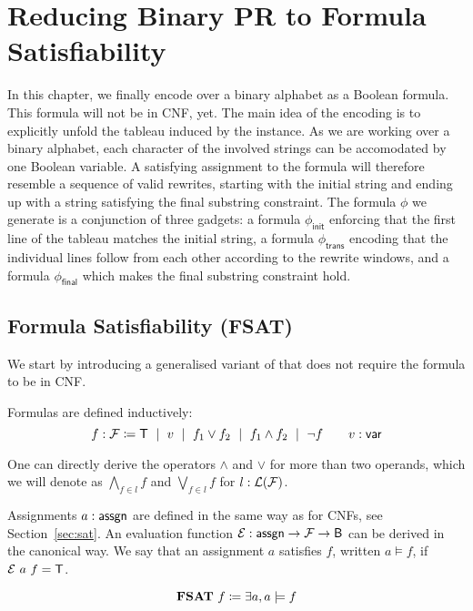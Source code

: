 
\chapter{Reducing Binary PR to Formula Satisfiability}\label{chap:bpr_fsat}
In this chapter, we finally encode \PR{} over a binary alphabet as a Boolean formula. This formula will not be in CNF, yet.
The main idea of the encoding is to explicitly unfold the tableau induced by the \BPR{} instance.
As we are working over a binary alphabet, each character of the involved strings can be accomodated by one Boolean variable. A satisfying assignment to the formula will therefore resemble a sequence of valid rewrites, starting with the initial string and ending up with a string satisfying the final substring constraint.
The formula $\phi$ we generate is a conjunction of three gadgets: a formula $\phi_{\textsf{init}}$ enforcing that the first line of the tableau matches the initial string, a formula $\phi_{\textsf{trans}}$ encoding that the individual lines follow from each other according to the rewrite windows, and a formula $\phi_{\textsf{final}}$ which makes the final substring constraint hold. 

\newcommand{\formula}{\mathcal{F}}
\section{Formula Satisfiability (FSAT)}
We start by introducing a generalised variant of \SAT{} that does not require the formula to be in CNF.

Formulas are defined inductively: 
\mnote{$\formula$}
\[f : \formula \defeq \btrue \bnfmid v \bnfmid f_1 \lor f_2 \bnfmid f_1 \land f_2 \bnfmid \lnot f \qquad v : \bvar \]

One can directly derive the operators $\land$ and $\lor$ for more than two operands, which we will denote as $\bigwedge_{f \in l} f$ and $\bigvee_{f \in l} f$ for $ l : \listsof{\formula}$. 

Assignments $a : \textsf{assgn}$ are defined in the same way as for CNFs, see Section~\ref{sec:sat}.
An evaluation function $\eval : \assgn \rightarrow \formula \rightarrow \bool$ can be derived in the canonical way. We say that an assignment $a$ satisfies $f$, written $a \models f$, if $\mathcal{E}~a~f = \mathsf{T}$.

\begin{definition}
  \mnote{\fsat{}}
  \[\textbf{FSAT}{}~f \coloneqq \exists a, a \models f \]
\end{definition}

